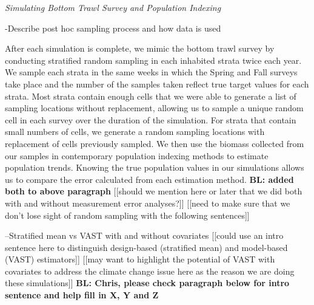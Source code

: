 \documentclass[
  12pt,
]{article}
\begin{document}
\emph{Simulating Bottom Trawl Survey and Population Indexing}

-Describe post hoc sampling process and how data is used

After each simulation is complete, we mimic the bottom trawl survey by conducting stratified random sampling in each inhabited strata twice each year. We sample each strata in the same weeks in which the Spring and Fall surveys take place and the number of the samples taken reflect true target values for each strata. Most strata contain enough cells that we were able to generate a list of sampling locations without replacement, allowing us to sample a unique random cell in each survey over the duration of the simulation. For strata that contain small numbers of cells, we generate a random sampling locations with replacement of cells previously sampled. We then use the biomass collected from our samples in contemporary population indexing methods to estimate population trends. Knowing the true population values in our simulations allows us to compare the error calculated from each estimation method.
\textbf{BL: added both to above paragraph}
{[}{[}should we mention here or later that we did both with and without measurement error analyses?{]}{]}
{[}{[}need to make sure that we don't lose sight of random sampling with the following sentences{]}{]}

--Stratified mean vs VAST with and without covariates
{[}{[}could use an intro sentence here to distinguish design-based (stratified mean) and model-based (VAST) estimators{]}{]}
{[}{[}may want to highlight the potential of VAST with covariates to address the climate change issue here as the reason we are doing these simulations{]}{]}
\textbf{BL: Chris, please check paragraph below for intro sentence and help fill in X, Y and Z}
\end{document}
